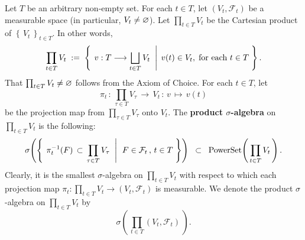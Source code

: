 \begin{definition}
\mbox{}\vskip 0.1cm
\noindent
Let $T$ be an arbitrary non-empty set.
For each $t \in T$, let $\left(V_{t},\mathcal{F}_{t}\right)$ be a measurable space
(in particular, $V_{t} \neq \varnothing$).
Let $\prod_{t \in T}V_{t}$ be the Cartesian product of $\left\{\,V_{t}\,\right\}_{t \in T}$.
In other words,
\begin{equation*}
\prod_{t \in T}V_{t}
\; := \;
\left\{\;
\left.
v : T \longrightarrow \bigsqcup_{t \in T}V_{t}
\;\;\right\vert\;
v(t) \in V_{t},
\;\textnormal{for each $t \in T$}
\;\right\}.
\end{equation*}
That $\prod_{t \in T}V_{t} \neq \varnothing$ follows from the Axiom of Choice.
For each $t \in T$, let
\begin{equation*}
\pi_{t} \,:\, \prod_{\tau \in T}V_{\tau} \,\longrightarrow\, V_{t} \,:\, v \, \longmapsto \, v(t)
\end{equation*}
be the projection map from $\prod_{\tau \in T}V_{\tau}$ onto $V_{t}$.
The \textbf{product $\sigma$-algebra} on $\prod_{t \in T}V_{t}$ is the following:
\begin{equation*}
\sigma\!\left(\left\{\;
\left.
\pi_{t}^{-1}\!\left(F\right) \,\subset\, \prod_{\tau \in T}V_{\tau}
\;\;\right\vert\;\,
F \in \mathcal{F}_{t} \,,\, t \in T
\;\right\}\right)
\;\; \subset \;\; \textnormal{PowerSet}\!\left(\,\prod_{t \in T}V_{t}\,\right).
\end{equation*}
Clearly, it is the smallest $\sigma$-algebra on $\prod_{t \in T}V_{t}$
with respect to which each projection map
$\pi_{t} : \prod_{t \in T}V_{t} \longrightarrow \left(V_{t},\mathcal{F}_{t}\right)$
is measurable.
We denote the product $\sigma$-algebra on $\prod_{t \in T}V_{t}$ by
\begin{equation*}
\sigma\!\left(\,\prod_{t \in T}(V_{t},\mathcal{F}_{t})\,\right).
\end{equation*}
\end{definition}

